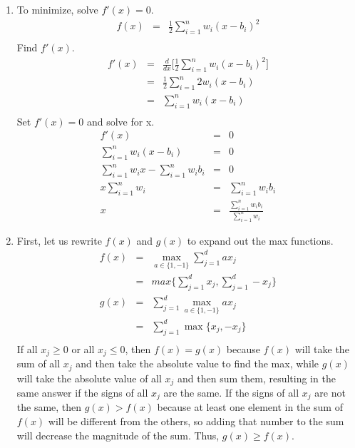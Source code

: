 \documentclass[12pt]{article}
\begin{document}
\begin{enumerate}[label=(\alph*)]

  \item To minimize, solve $f'(x) = 0$.
  \begin{eqnarray*}
  f(x) &=& \frac{1}{2}\displaystyle\sum\limits_{i=1}^n w_i (x-b_i)^2\\
  \end{eqnarray*}
  Find $f'(x)$.
  \begin{eqnarray*}
  f'(x) &=& \frac{d}{dx}\biggl[\frac{1}{2}\displaystyle\sum\limits_{i=1}^n w_i (x-b_i)^2\biggr]\\
  &=& \frac{1}{2}\displaystyle\sum\limits_{i=1}^n 2w_i (x-b_i)\\
  &=& \displaystyle\sum\limits_{i=1}^n w_i (x-b_i)\\
  \end{eqnarray*}
  Set $f'(x) = 0$ and solve for x.
  \begin{eqnarray*}
  f'(x) &=& 0\\
  \displaystyle\sum\limits_{i=1}^n w_i (x-b_i) &=& 0\\
  \displaystyle\sum\limits_{i=1}^n w_i x - \displaystyle\sum\limits_{i=1}^n w_i b_i &=& 0\\
  x \displaystyle\sum\limits_{i=1}^n w_i &=& \displaystyle\sum\limits_{i=1}^n w_i b_i\\
  x &=& \frac{\sum_{i=1}^n w_i b_i}{\sum_{i=1}^n w_i}
  \end{eqnarray*}

  \item First, let us rewrite $f(x)$ and $g(x)$ to expand out the max functions. 
  \begin{eqnarray*}
  f(x) &=& \max_{a \in \lbrace1, -1\rbrace} \displaystyle\sum\limits_{j=1}^d ax_j\\
  &=& max \biggl\lbrace \displaystyle\sum\limits_{j=1}^d x_j , \displaystyle\sum\limits_{j=1}^d -x_j \biggr\rbrace\\
  g(x) &=& \displaystyle\sum\limits_{j=1}^d \max_{a \in \{1,-1\}} a x_j\\
  &=& \displaystyle\sum\limits_{j=1}^d \max \biggl\lbrace x_j , -x_j \biggr\rbrace\\
  \end{eqnarray*}
  If all $x_j \ge 0$ or all $x_j \le 0$, then $f(x) = g(x)$ because $f(x)$ will take the sum of all $x_j$ and then take the absolute value to find the max, while $g(x)$ will take the absolute value of all $x_j$ and then sum them, resulting in the same answer if the signs of all $x_j$ are the same. If the signs of all $x_j$ are not the same, then $g(x) > f(x)$ because at least one element in the sum of $f(x)$ will be different from the others, so adding that number to the sum will decrease the magnitude of the sum. Thus, $g(x) \ge f(x)$.


\end{enumerate}
\end{document}
